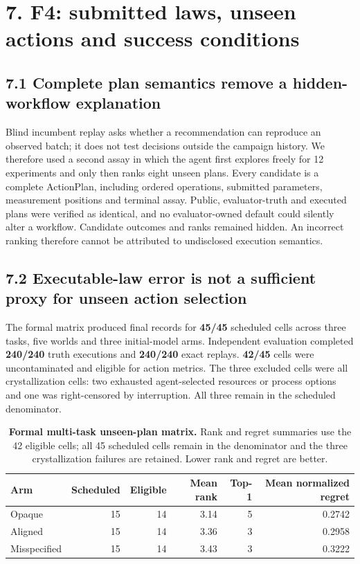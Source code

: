 \documentclass[10pt,twocolumn]{article}
\begin{document}
\section{7. F4: submitted laws, unseen actions and success
conditions}\label{f4-submitted-laws-unseen-actions-and-success-conditions}

\subsection{7.1 Complete plan semantics remove a hidden-workflow
explanation}\label{complete-plan-semantics-remove-a-hidden-workflow-explanation}

Blind incumbent replay asks whether a recommendation can reproduce an
observed batch; it does not test decisions outside the campaign history.
We therefore used a second assay in which the agent first explores
freely for 12 experiments and only then ranks eight unseen plans. Every
candidate is a complete ActionPlan, including ordered operations,
submitted parameters, measurement positions and terminal assay. Public,
evaluator-truth and executed plans were verified as identical, and no
evaluator-owned default could silently alter a workflow. Candidate
outcomes and ranks remained hidden. An incorrect ranking therefore
cannot be attributed to undisclosed execution semantics.

\subsection{7.2 Executable-law error is not a sufficient proxy for
unseen action
selection}\label{executable-law-error-is-not-a-sufficient-proxy-for-unseen-action-selection}

The formal matrix produced final records for \textbf{45/45} scheduled
cells across three tasks, five worlds and three initial-model arms.
Independent evaluation completed \textbf{240/240} truth executions and
\textbf{240/240} exact replays. \textbf{42/45} cells were uncontaminated
and eligible for action metrics. The three excluded cells were all
crystallization cells: two exhausted agent-selected resources or process
options and one was right-censored by interruption. All three remain in
the scheduled denominator.

\begin{table}[!t]
\centering
\caption{\textbf{Formal multi-task unseen-plan matrix.} Rank and regret summaries use the 42 eligible cells; all 45 scheduled cells remain in the denominator and the three crystallization failures are retained. Lower rank and regret are better.}
\label{tab:open-action-matrix}
\scriptsize
\begin{tabular}{lrrrrr}
\toprule
Arm & Scheduled & Eligible & Mean rank & Top-1 & Mean normalized regret \\
\midrule
Opaque & 15 & 14 & 3.14 & 5 & 0.2742 \\
Aligned & 15 & 14 & 3.36 & 3 & 0.2958 \\
Misspecified & 15 & 14 & 3.43 & 3 & 0.3222 \\
\bottomrule
\end{tabular}
\end{table}
\end{document}
